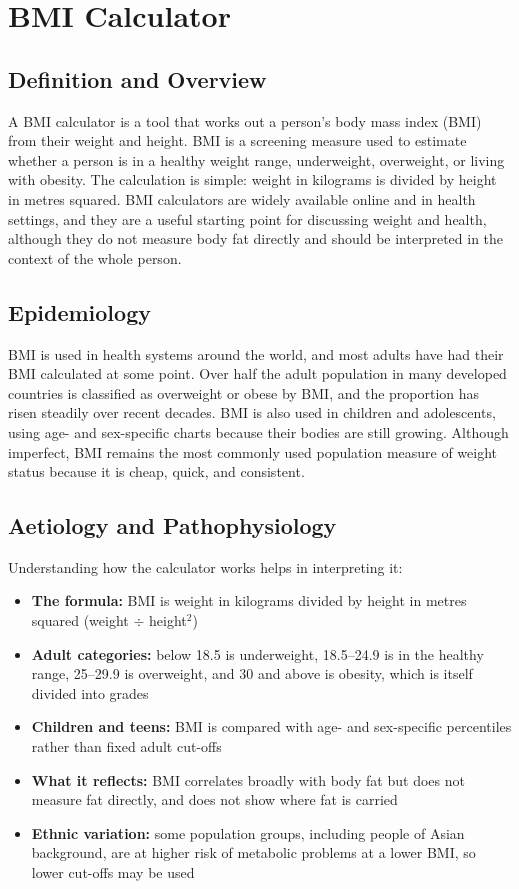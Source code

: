 \chapter{BMI Calculator}

\section*{Definition and Overview}
A BMI calculator is a tool that works out a person's body mass index (BMI) from their weight and height. BMI is a screening measure used to estimate whether a person is in a healthy weight range, underweight, overweight, or living with obesity. The calculation is simple: weight in kilograms is divided by height in metres squared. BMI calculators are widely available online and in health settings, and they are a useful starting point for discussing weight and health, although they do not measure body fat directly and should be interpreted in the context of the whole person.

\section*{Epidemiology}
BMI is used in health systems around the world, and most adults have had their BMI calculated at some point. Over half the adult population in many developed countries is classified as overweight or obese by BMI, and the proportion has risen steadily over recent decades. BMI is also used in children and adolescents, using age- and sex-specific charts because their bodies are still growing. Although imperfect, BMI remains the most commonly used population measure of weight status because it is cheap, quick, and consistent.

\section*{Aetiology and Pathophysiology}
Understanding how the calculator works helps in interpreting it:

\begin{itemize}
    \item \textbf{The formula:} BMI is weight in kilograms divided by height in metres squared (weight $\div$ height$^2$)
    \item \textbf{Adult categories:} below 18.5 is underweight, 18.5--24.9 is in the healthy range, 25--29.9 is overweight, and 30 and above is obesity, which is itself divided into grades
    \item \textbf{Children and teens:} BMI is compared with age- and sex-specific percentiles rather than fixed adult cut-offs
    \item \textbf{What it reflects:} BMI correlates broadly with body fat but does not measure fat directly, and does not show where fat is carried
    \item \textbf{Ethnic variation:} some population groups, including people of Asian background, are at higher risk of metabolic problems at a lower BMI, so lower cut-offs may be used
\end{itemize}

